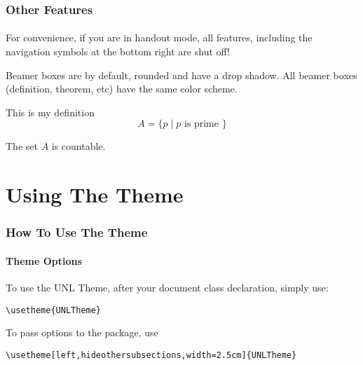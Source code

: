 \documentclass{beamer}
\begin{document}
\begin{frame}  %
    \frametitle{Other Features}
    \framesubtitle{}
    
    For convenience, if you are in handout mode, all features, including the
    navigation symbols at the bottom right are shut off!


    Beamer boxes are by default, rounded and have a drop shadow.  All beamer
    boxes (definition, theorem, etc) have the same color scheme.

    \begin{definition}
      This is my definition
      $$A = \{p \mid \textrm{$p$ is prime }\}$$
    \end{definition}
    
    \begin{theorem}
      The set $A$ is countable.
    \end{theorem}

\end{frame}

\section{Using The Theme}

\begin{frame}[fragile]
    \frametitle{How To Use The Theme}
    \framesubtitle{Theme Options}
    
    To use the UNL Theme, after your document class declaration, simply use:
    
    \begin{verbatim}\usetheme{UNLTheme}\end{verbatim}
    
    To pass options to the package, use
    
    \verb"\usetheme[left,hideothersubsections,width=2.5cm]{UNLTheme}"
    
\end{frame}
\end{document}
